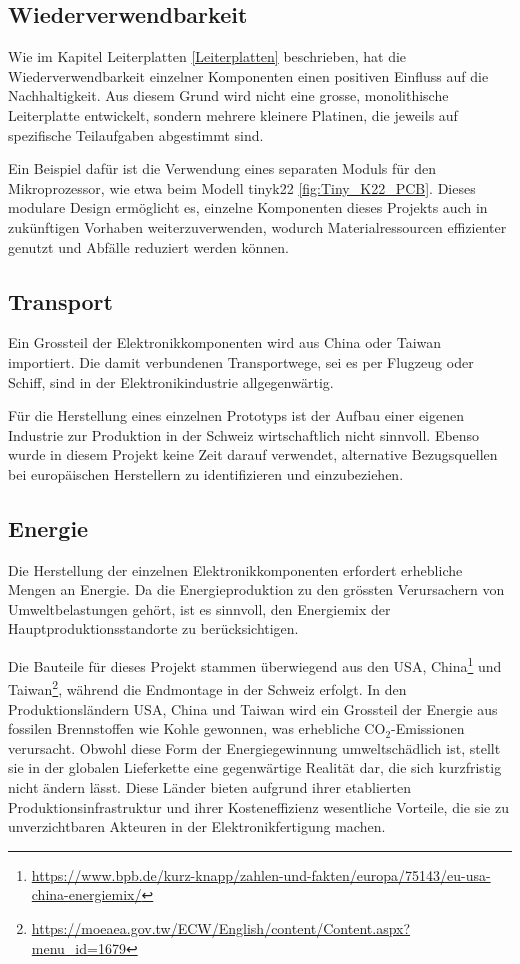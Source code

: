 \subsection{Wiederverwendbarkeit}

Wie im Kapitel Leiterplatten \ref{Leiterplatten} beschrieben, hat die Wiederverwendbarkeit einzelner Komponenten einen positiven Einfluss auf die Nachhaltigkeit. Aus diesem Grund wird nicht eine grosse, monolithische Leiterplatte entwickelt, sondern mehrere kleinere Platinen, die jeweils auf spezifische Teilaufgaben abgestimmt sind.

Ein Beispiel dafür ist die Verwendung eines separaten Moduls für den Mikroprozessor, wie etwa beim Modell \acrfull{tinyk22} \ref{fig:Tiny_K22_PCB}. Dieses modulare Design ermöglicht es, einzelne Komponenten dieses Projekts auch in zukünftigen Vorhaben weiterzuverwenden, wodurch Materialressourcen effizienter genutzt und Abfälle reduziert werden können.

\subsection{Transport}

Ein Grossteil der Elektronikkomponenten wird aus China oder Taiwan importiert. Die damit verbundenen Transportwege, sei es per Flugzeug oder Schiff, sind in der Elektronikindustrie allgegenwärtig.

Für die Herstellung eines einzelnen Prototyps ist der Aufbau einer eigenen Industrie zur Produktion in der Schweiz wirtschaftlich nicht sinnvoll. Ebenso wurde in diesem Projekt keine Zeit darauf verwendet, alternative Bezugsquellen bei europäischen Herstellern zu identifizieren und einzubeziehen.

\subsection{Energie}

Die Herstellung der einzelnen Elektronikkomponenten erfordert erhebliche Mengen an Energie. Da die Energieproduktion zu den grössten Verursachern von Umweltbelastungen gehört, ist es sinnvoll, den Energiemix der Hauptproduktionsstandorte zu berücksichtigen.

Die Bauteile für dieses Projekt stammen überwiegend aus den USA, China\footnote{\url{https://www.bpb.de/kurz-knapp/zahlen-und-fakten/europa/75143/eu-usa-china-energiemix/}} und Taiwan\footnote{\url{https://moeaea.gov.tw/ECW/English/content/Content.aspx?menu_id=1679}}, während die Endmontage in der Schweiz erfolgt. In den Produktionsländern USA, China und Taiwan wird ein Grossteil der Energie aus fossilen Brennstoffen wie Kohle gewonnen, was erhebliche CO$_{2}$-Emissionen verursacht. Obwohl diese Form der Energiegewinnung umweltschädlich ist, stellt sie in der globalen Lieferkette eine gegenwärtige Realität dar, die sich kurzfristig nicht ändern lässt. Diese Länder bieten aufgrund ihrer etablierten Produktionsinfrastruktur und ihrer Kosteneffizienz wesentliche Vorteile, die sie zu unverzichtbaren Akteuren in der Elektronikfertigung machen.

